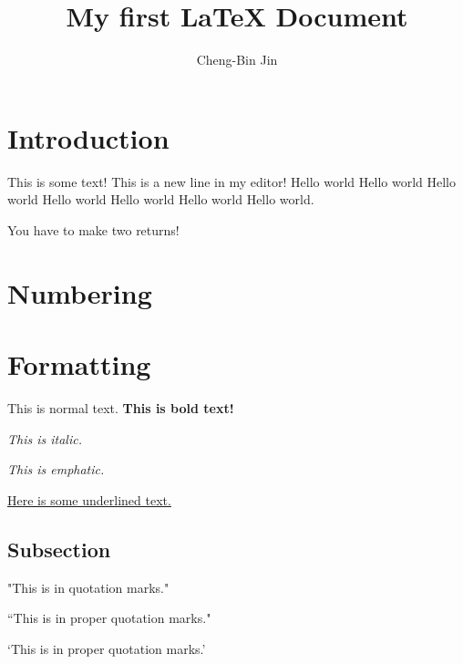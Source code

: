 \documentclass{article}
\author{Cheng-Bin Jin}
\title{My first {\LaTeX} Document}
\begin{document}
\maketitle

\section{Introduction}
This is some text!
This is a new line in my editor! Hello world Hello world Hello world Hello world Hello world Hello world Hello world.

You have to make two returns!

\section{Numbering}

\section{Formatting}

This is normal text. \textbf{This is bold text!}

\textit{This is italic.}

\emph{This is emphatic.}

\underline{Here is some underlined text.}

\subsection{Subsection}

"This is in quotation marks."

``This is in proper quotation marks."

`This is in proper quotation marks.'
\end{document}
